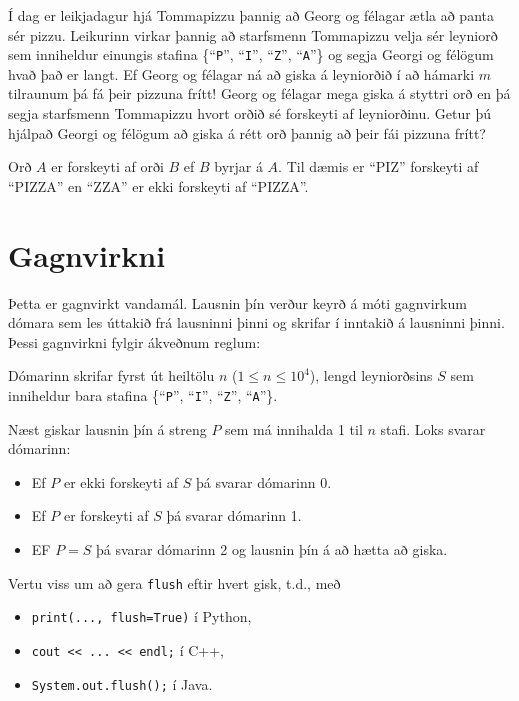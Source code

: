 
Í dag er leikjadagur hjá Tommapizzu þannig að Georg og félagar ætla að panta
sér pizzu. Leikurinn virkar þannig að starfsmenn Tommapizzu velja sér leyniorð
sem inniheldur einungis stafina \{``\texttt{P}'', ``\texttt{I}'',
``\texttt{Z}'', ``\texttt{A}''\} og segja Georgi og félögum hvað það er langt.
Ef Georg og félagar ná að giska á leyniorðið í að hámarki $m$ tilraunum þá fá
þeir pizzuna frítt! Georg og félagar mega giska á styttri orð en þá segja
starfsmenn Tommapizzu hvort orðið sé forskeyti af leyniorðinu. Getur þú hjálpað
Georgi og félögum að giska á rétt orð þannig að þeir fái pizzuna frítt?

Orð $A$ er forskeyti af orði $B$ ef $B$ byrjar á $A$. Til dæmis er ``PIZ''
forskeyti af ``PIZZA'' en ``ZZA'' er ekki forskeyti af ``PIZZA''.

\section*{Gagnvirkni}
Þetta er gagnvirkt vandamál. Lausnin þín verður keyrð á móti gagnvirkum dómara
sem les úttakið frá lausninni þinni og skrifar í inntakið á lausninni þinni.
Þessi gagnvirkni fylgir ákveðnum reglum:

Dómarinn skrifar fyrst út heiltölu $n$ ($1 \leq n \leq 10^4$), lengd
leyniorðsins $S$ sem inniheldur bara stafina \{``\texttt{P}'', ``\texttt{I}'',
``\texttt{Z}'', ``\texttt{A}''\}.

Næst giskar lausnin þín á streng $P$ sem má innihalda 1 til $n$ stafi. Loks
svarar dómarinn:
\begin{itemize}
    \item Ef $P$ er ekki forskeyti af $S$ þá svarar dómarinn 0.
    \item Ef $P$ er forskeyti af $S$ þá svarar dómarinn 1.
    \item EF $P = S$ þá svarar dómarinn 2 og lausnin þín á að hætta að giska.
\end{itemize}

Vertu viss um að gera \texttt{flush} eftir hvert gisk, t.d., með
\begin{itemize}
    \item \texttt{print(..., flush=True)} í Python,
    \item \texttt{cout << ... << endl;} í C++,
    \item \texttt{System.out.flush();} í Java.
\end{itemize}

